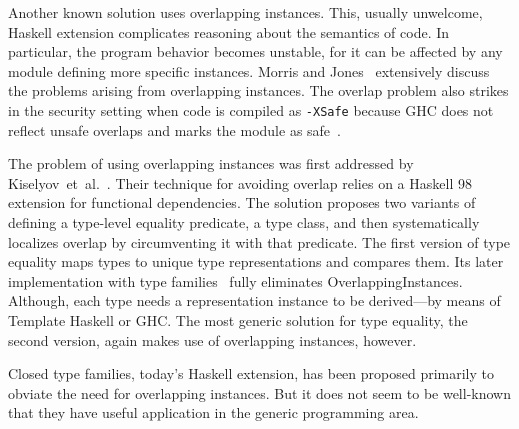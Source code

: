 \documentclass[runningheads]{llncs}
\newcommand{\K}[1]{\lstinline{#1}}
\begin{document}
Another known solution uses overlapping instances. This, usually unwelcome, Haskell extension complicates reasoning about the semantics of code. In particular, the program behavior becomes unstable, for it can be affected by any module defining more specific instances. Morris and Jones~\cite{Morris2010} extensively discuss the problems arising from overlapping instances.
The overlap problem also strikes in the security setting when code is compiled as \K{-XSafe} because GHC does not reflect unsafe overlaps and marks the module as safe~\cite{sh-overlapping}.

The problem of using overlapping instances was first addressed by Kiselyov~et~al.~\cite{Kiselyov2004}. Their technique for avoiding overlap relies on a Haskell 98 extension for functional dependencies. The solution proposes two variants of defining a type-level equality predicate, a type class, and then systematically localizes overlap by circumventing it with that predicate. The first version of type equality maps types to unique type representations and compares them. Its later implementation with type families~\cite{Kiselyov2012} fully eliminates \textsf{OverlappingInstances}. Although, each type needs a representation instance to be derived---by means of Template Haskell or GHC. The most generic solution for type equality, the second version, again makes use of overlapping instances, however.

Closed type families, today's Haskell extension, has been proposed primarily to obviate the need for overlapping instances. But it does not seem to be well-known that they have useful application in the generic programming area.
\end{document}
